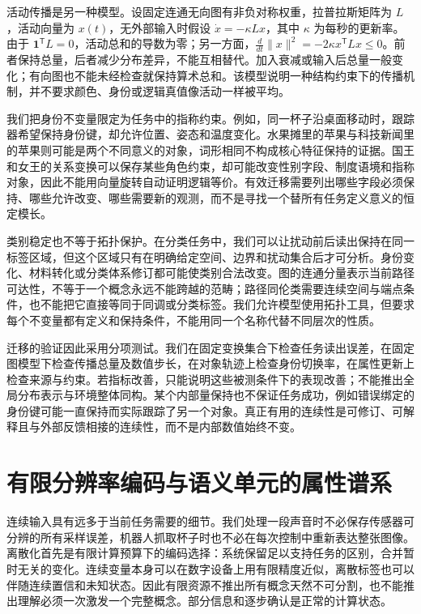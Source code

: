 活动传播是另一种模型。设固定连通无向图有非负对称权重，拉普拉斯矩阵为 $L$，活动向量为 $x(t)$，无外部输入时假设 $\dot x=-\kappa Lx$，其中 $\kappa$ 为每秒的更新率。由于 $\mathbf 1^{\mathsf T}L=0$，活动总和的导数为零；另一方面，$\frac d{dt}\|x\|^2=-2\kappa x^{\mathsf T}Lx\leq0$。前者保持总量，后者减少分布差异，不能互相替代。加入衰减或输入后总量一般变化；有向图也不能未经检查就保持算术总和。该模型说明一种结构约束下的传播机制，并不要求颜色、身份或逻辑真值像活动一样被平均。

我们把身份不变量限定为任务中的指称约束。例如，同一杯子沿桌面移动时，跟踪器希望保持身份键，却允许位置、姿态和温度变化。水果摊里的苹果与科技新闻里的苹果则可能是两个不同意义的对象，词形相同不构成核心特征保持的证据。国王和女王的关系变换可以保存某些角色约束，却可能改变性别字段、制度语境和指称对象，因此不能用向量旋转自动证明逻辑等价。有效迁移需要列出哪些字段必须保持、哪些允许改变、哪些需要新的观测，而不是寻找一个替所有任务定义意义的恒定模长。

类别稳定也不等于拓扑保护。在分类任务中，我们可以让扰动前后读出保持在同一标签区域，但这个区域只有在明确给定空间、边界和扰动集合后才可分析。身份变化、材料转化或分类体系修订都可能使类别合法改变。图的连通分量表示当前路径可达性，不等于一个概念永远不能跨越的范畴；路径同伦类需要连续空间与端点条件，也不能把它直接等同于同调或分类标签。我们允许模型使用拓扑工具，但要求每个不变量都有定义和保持条件，不能用同一个名称代替不同层次的性质。

迁移的验证因此采用分项测试。我们在固定变换集合下检查任务读出误差，在固定图模型下检查传播总量及数值步长，在对象轨迹上检查身份切换率，在属性更新上检查来源与约束。若指标改善，只能说明这些被测条件下的表现改善；不能推出全局分布表示与环境整体同构。某个内部量保持也不保证任务成功，例如错误绑定的身份键可能一直保持而实际跟踪了另一个对象。真正有用的连续性是可修订、可解释且与外部反馈相接的连续性，而不是内部数值始终不变。

\section{有限分辨率编码与语义单元的属性谱系}
\label{sec:section_1867}
\label{sec:section_5195}

连续输入具有远多于当前任务需要的细节。我们处理一段声音时不必保存传感器可分辨的所有采样误差，机器人抓取杯子时也不必在每次控制中重新表达整张图像。离散化首先是有限计算预算下的编码选择：系统保留足以支持任务的区别，合并暂时无关的变化。连续变量本身可以在数字设备上用有限精度近似，离散标签也可以伴随连续置信和未知状态。因此有限资源不推出所有概念天然不可分割，也不能推出理解必须一次激发一个完整概念。部分信息和逐步确认是正常的计算状态。

